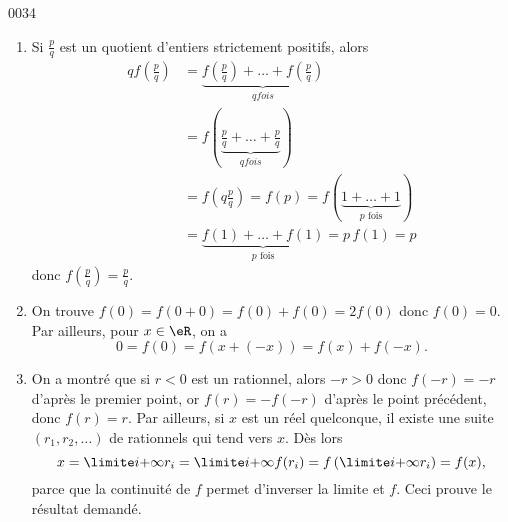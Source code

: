 
\begin{corrige}{0034}

\begin{enumerate}
\item Si $\frac p q$ est un quotient d'entiers strictement positifs,
  alors
  \begin{align*}
    q f(\frac pq) &= \underbrace{f(\frac pq) + \ldots + f(\frac pq)}_{\text{$q fois$}}\\
    &= f(\underbrace{\frac pq + \ldots
      + \frac pq}_{\text{$q fois$}})\\
    &= f(q \frac pq) = f(p) = f(\underbrace{1 +
      \ldots + 1}_{\text{$p$ fois}})\\
    &= \underbrace{f(1)+\ldots+f(1)}_{\text{$p$ fois}} = p \, f(1) = p
  \end{align*}
  donc $f(\frac pq) = \frac pq$.

\item On trouve $f(0) = f(0+0) = f(0)+f(0) = 2 f(0)$ donc
  $f(0)=0$. Par ailleurs, pour $x \in \eR$, on a
  \begin{equation*}
    0 = f(0) = f(x+(-x)) = f(x) + f(-x).
  \end{equation*}

\item On a montré que si $r < 0$ est un rationnel, alors $-r > 0$ donc $f(-r) = -r$ d'après le premier point, or $f(r) = -f(-r)$ d'après le point précédent, donc $f(r) = r$. Par ailleurs, si $x$ est un réel quelconque, il existe une suite $(r_1, r_2, \ldots)$ de rationnels qui tend vers $x$. Dès lors
  \begin{equation*}
    x = \limite i {+\infty} r_i =  \limite i {+\infty} f(r_i) = f\left(\limite i {+\infty} r_i\right) = f(x),
  \end{equation*}
parce que la continuité de $f$ permet d'inverser la limite et $f$. Ceci prouve le résultat demandé.
\end{enumerate}

\end{corrige}
